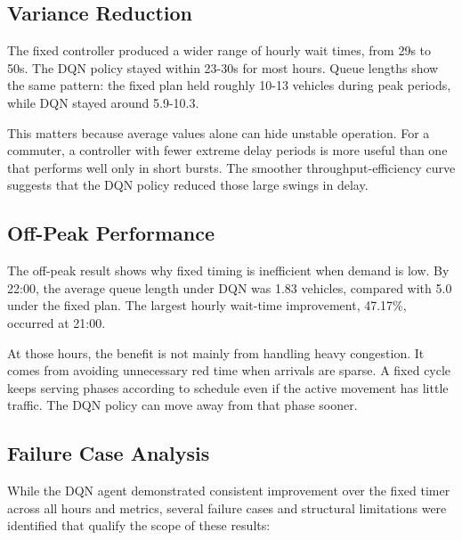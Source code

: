 \subsection{Variance Reduction}
\label{subsec:variance_reduction}

The fixed controller produced a wider range of hourly wait times, from
29s to 50s. The DQN policy stayed within 23-30s for most hours. Queue
lengths show the same pattern: the fixed plan held roughly 10-13 vehicles
during peak periods, while DQN stayed around 5.9-10.3.

This matters because average values alone can hide unstable operation.
For a commuter, a controller with fewer extreme delay periods is more
useful than one that performs well only in short bursts. The smoother
throughput-efficiency curve suggests that the DQN policy reduced those
large swings in delay.

\subsection{Off-Peak Performance}
\label{subsec:off_peak_performance}

The off-peak result shows why fixed timing is inefficient when demand is
low. By 22:00, the average queue length under DQN was 1.83 vehicles,
compared with 5.0 under the fixed plan. The largest hourly wait-time
improvement, 47.17\%, occurred at 21:00.

At those hours, the benefit is not mainly from handling heavy congestion.
It comes from avoiding unnecessary red time when arrivals are sparse. A
fixed cycle keeps serving phases according to schedule even if the active
movement has little traffic. The DQN policy can move away from that phase
sooner.

\subsection{Failure Case Analysis}
\label{subsec:failure_case_analysis}

While the DQN agent demonstrated consistent improvement over the fixed
timer across all hours and metrics, several failure cases and structural
limitations were identified that qualify the scope of these results:

